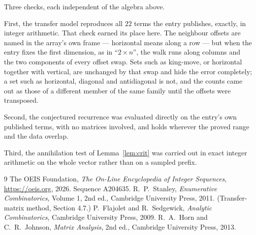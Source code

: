 \documentclass[11pt,a4paper]{article}
\theoremstyle{plain}
\theoremstyle{definition}
\begin{document}
Three checks, each independent of the algebra above.

First, the transfer model reproduces all $22$ terms the entry publishes, exactly, in
integer arithmetic. That check earned its place here. The neighbour offsets are named in the
array's own frame --- horizontal means along a row --- but when the entry fixes the first
dimension, as in ``$2\times n$'', the walk runs along columns and the two components of every
offset swap. Sets such as king-move, or horizontal together with vertical, are unchanged by
that swap and hide the error completely; a set such as horizontal, diagonal and antidiagonal
is not, and the counts came out as those of a different member of the same family until the
offsets were transposed.

Second, the conjectured recurrence was evaluated directly on the entry's own published terms,
with no matrices involved, and holds wherever the proved range and the data overlap.

Third, the annihilation test of Lemma~\ref{lem:crit} was carried out in exact integer
arithmetic on the whole vector rather than on a sampled prefix.

\begin{thebibliography}{9}
 The OEIS Foundation, \emph{The On-Line Encyclopedia of Integer
Sequences}, \url{https://oeis.org}, 2026. Sequence A204635.
 R.~P.~Stanley, \emph{Enumerative Combinatorics}, Volume 1, 2nd ed.,
Cambridge University Press, 2011. (Transfer-matrix method, Section 4.7.)
 P.~Flajolet and R.~Sedgewick, \emph{Analytic Combinatorics}, Cambridge
University Press, 2009.
 R.~A.~Horn and C.~R.~Johnson, \emph{Matrix Analysis}, 2nd ed., Cambridge
University Press, 2013.
\end{thebibliography}
\end{document}

